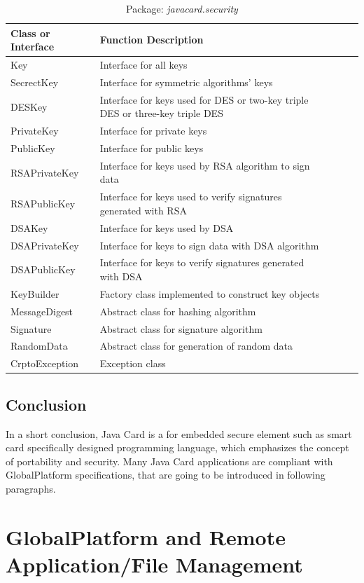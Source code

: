 \begin{table}[ht]
\caption{Package: \emph{javacard.security}}
\centering
\begin{tabular}{lllll}
\hline
 Class or Interface & Function Description\\
\hline\hline
 Key &Interface for all keys   \\
 SecrectKey &Interface for symmetric algorithms' keys\\
DESKey & \parbox[t]{10cm}{Interface for keys used for DES or two-key triple DES or three-key triple DES}\\
PrivateKey &Interface for private keys\\
PublicKey & Interface for public keys\\
RSAPrivateKey& Interface for keys used by RSA algorithm to sign data\\
RSAPublicKey & Interface for keys used to verify signatures generated with RSA \\
DSAKey& Interface for keys used by DSA\\ 
DSAPrivateKey& Interface for keys to sign data with DSA algorithm\\
DSAPublicKey& Interface for keys to verify signatures generated with DSA\\
KeyBuilder& Factory class implemented to construct key objects\\
MessageDigest& Abstract class for hashing algorithm\\
Signature& Abstract class for signature algorithm\\
RandomData&Abstract class for generation of random data \\
CrptoException& Exception class\\
\hline
\end{tabular}
\label{table:javacard-security}
\end{table}

\subsection{Conclusion}
In a short conclusion, Java Card is a for embedded secure element such as smart card specifically designed programming language, which emphasizes the concept of portability and security. Many Java Card applications are compliant with GlobalPlatform specifications, that are going to be introduced in following paragraphs.

\section{GlobalPlatform and Remote Application/File Management}\label{secGP}

